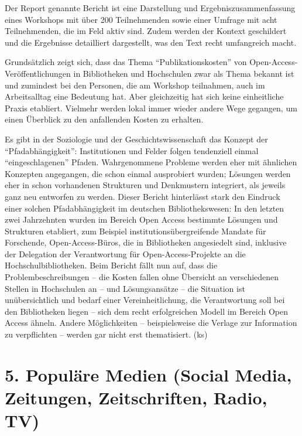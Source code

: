 \documentclass[a4paper,
fontsize=11pt,
oneside,
numbers=noperiodatend,
parskip=half-,
bibliography=totoc,
final
]{scrartcl}
\begin{document}
Der Report genannte Bericht ist eine Darstellung und
Ergebniszusammenfassung eines Workshops mit über 200 Teilnehmenden sowie
einer Umfrage mit acht Teilnehmenden, die im Feld aktiv sind. Zudem
werden der Kontext geschildert und die Ergebnisse detailliert
dargestellt, was den Text recht umfangreich macht.

Grundsätzlich zeigt sich, dass das Thema \enquote{Publikationskosten}
von Open-Access-Veröffentli\-chungen in Bibliotheken und Hochschulen zwar
als Thema bekannt ist und zumindest bei den Personen, die am Workshop
teilnahmen, auch im Arbeitsalltag eine Bedeutung hat. Aber gleichzeitig
hat sich keine einheitliche Praxis etabliert. Vielmehr werden lokal
immer wieder andere Wege gegangen, um einen Überblick zu den anfallenden
Kosten zu erhalten.

Es gibt in der Soziologie und der Geschichtswissenschaft das Konzept der
\enquote{Pfadabhängigkeit}: Institutionen und Felder folgen tendenziell
einmal \enquote{eingeschlagenen} Pfaden. Wahrgenommene Probleme werden
eher mit ähnlichen Konzepten angegangen, die schon einmal ausprobiert
wurden; Lösungen werden eher in schon vorhandenen Strukturen und
Denkmustern integriert, als jeweils ganz neu entworfen zu werden. Dieser
Bericht hinterlässt stark den Eindruck einer solchen Pfadabhängigkeit im
deutschen Bibliothekswesen: In den letzten zwei Jahrzehnten wurden im
Bereich Open Access bestimmte Lösungen und Strukturen etabliert, zum
Beispiel institutionsübergreifende Mandate für Forschende,
Open-Access-Büros, die in Bibliotheken angesiedelt sind, inklusive der
Delegation der Verantwortung für Open-Access-Projekte an die
Hochschulbibliotheken. Beim Bericht fällt nun auf, dass die
Problembeschreibungen -- die Kosten fallen ohne Übersicht an
verschiedenen Stellen in Hochschulen an -- und Lösungsansätze -- die
Situation ist unübersichtlich und bedarf einer Vereinheitlichung, die
Verantwortung soll bei den Bibliotheken liegen -- sich dem recht
erfolgreichen Modell im Bereich Open Access ähneln. Andere Möglichkeiten
-- beispielsweise die Verlage zur Information zu verpflichten -- werden
gar nicht erst thematisiert. (ks)

\hypertarget{populuxe4re-medien-social-media-zeitungen-zeitschriften-radio-tv}{%
\section{5. Populäre Medien (Social Media, Zeitungen,
Zeitschriften, Radio,
TV)}\label{populuxe4re-medien-social-media-zeitungen-zeitschriften-radio-tv}}
\end{document}
